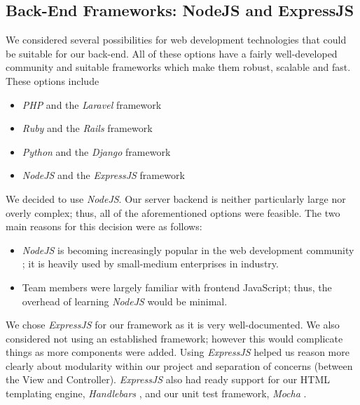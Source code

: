 \documentclass[a4paper, 10pt]{report}
\begin{document}
\subsection{Back-End Frameworks: NodeJS and ExpressJS}
We considered several possibilities for web development technologies that could be suitable for our back-end. All of these options have a fairly well-developed community and suitable frameworks which make them robust, scalable and fast. These options include \begin{itemize}
\item \textit{PHP} and the \textit{Laravel} \cite{laravel} framework
\item \textit{Ruby} and the \textit{Rails} \cite{rails} framework
\item \textit{Python} and the \textit{Django} \cite{django} framework
\item \textit{NodeJS} and the \textit{ExpressJS} \cite{expressjs} framework
\end{itemize}
We decided to use \textit{NodeJS}. Our server backend is neither particularly large nor overly complex; thus, all of the aforementioned options were feasible. The two main reasons for this decision were as follows:
\begin{itemize}
\item \textit{NodeJS} is becoming increasingly popular in the web development community \cite{nodejs-popular}; it is heavily used by small-medium enterprises in industry.
\item Team members were largely familiar with frontend JavaScript; thus, the overhead of learning \textit{NodeJS} would be minimal.
\end{itemize}
We chose \textit{ExpressJS} for our framework as it is very well-documented. We also considered not using an established framework; however this would complicate things as more components were added. Using \textit{ExpressJS} helped us reason more clearly about modularity within our project and separation of concerns (between the View and Controller). \textit{ExpressJS} also had ready support for our HTML templating engine, \textit{Handlebars} \cite{handlebars}, and our unit test framework, \textit{Mocha} \cite{mocha}.
\end{document}
